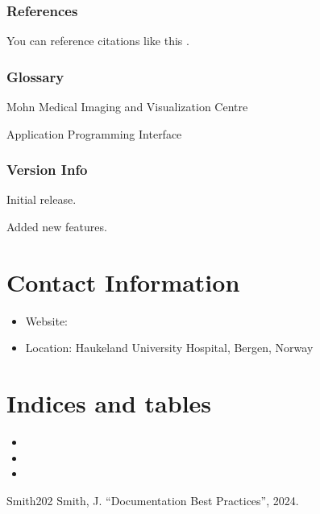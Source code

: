 \documentclass[letterpaper,10pt,english]{sphinxmanual}
\begin{document}
\subsection{References}
\label{\detokenize{advanced-features:references}}
\sphinxAtStartPar
You can reference citations like this .


\subsection{Glossary}
\label{\detokenize{advanced-features:glossary}}\begin{description}
\sphinxAtStartPar
Mohn Medical Imaging and Visualization Centre

\sphinxAtStartPar
Application Programming Interface

\end{description}


\subsection{Version Info}
\label{\detokenize{advanced-features:version-info}}
\sphinxAtStartPar
{}Initial release.

\sphinxAtStartPar
{}Added new features.


\chapter{Contact Information}
\label{\detokenize{index:contact-information}}\begin{itemize}
\item {} 
\sphinxAtStartPar
Website: 

\item {} 
\sphinxAtStartPar
Location: Haukeland University Hospital, Bergen, Norway

\end{itemize}


\chapter{Indices and tables}
\label{\detokenize{index:indices-and-tables}}\begin{itemize}
\item {} 
\sphinxAtStartPar
{}

\item {} 
\sphinxAtStartPar
{}

\item {} 
\sphinxAtStartPar
{}

\end{itemize}

\begin{sphinxthebibliography}{Smith202}
\sphinxAtStartPar
Smith, J. “Documentation Best Practices”, 2024.
\end{sphinxthebibliography}



\renewcommand{\indexname}{Index}
\printindex
\end{document}
